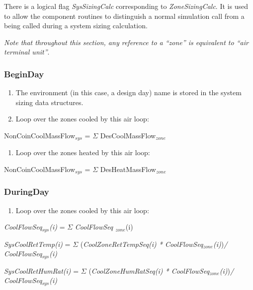 There is a logical flag \emph{SysSizingCalc} corresponding to \emph{ZoneSizingCalc}. It is used to allow the component routines to distinguish a normal simulation call from a being called during a system sizing calculation.

\emph{Note that throughout this section, any reference to a ``zone'' is equivalent to ``air terminal unit''}.

\subsubsection{BeginDay}\label{beginday}

\begin{enumerate}
\def\labelenumi{(\arabic{enumi})}
\item
  The environment (in this case, a design day) name is stored in the system sizing data structures.
\item
  Loop over the zones cooled by this air loop: 
\end{enumerate}

{\setlength\parindent{25pt} NonCoinCoolMassFlow\(_{sys}\) = $\Sigma$ {DesCoolMassFlow\(_{zone}\)} }

\begin{enumerate}
\def\labelenumi{(\arabic{enumi})}
\setcounter{enumi}{2}
\tightlist
\item
  Loop over the zones heated by this air loop: 
\end{enumerate}

{\setlength\parindent{25pt} NonCoinCoolMassFlow\(_{sys}\) = $\Sigma$ {DesHeatMassFlow\(_{zone}\)} }

\subsubsection{DuringDay}\label{duringday}

\begin{enumerate}
\def\labelenumi{(\arabic{enumi})}
\tightlist
\item
  Loop over the zones cooled by this air loop:
\end{enumerate}

\emph{CoolFlowSeq\(_{sys}\)(i)} = $\Sigma$ \emph{CoolFlowSeq \(_{zone}\)}(i)

\emph{SysCoolRetTemp(i)} = $\Sigma$ (\emph{CoolZoneRetTempSeq(i) * CoolFlowSeq\(_{zone}\)(i)})\emph{/ CoolFlowSeq\(_{sys}\)(i)}

\emph{SysCoolRetHumRat(i)} = $\Sigma$ (\emph{CoolZoneHumRatSeq(i) * CoolFlowSeq\(_{zone}\)(i)})\emph{/ CoolFlowSeq\(_{sys}\)(i)}

